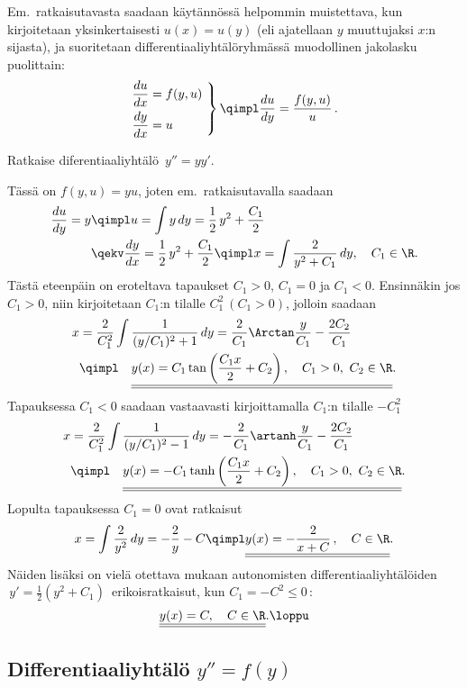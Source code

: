 Em.\ ratkaisutavasta saadaan käytännössä helpommin muistettava, kun kirjoitetaan
yksinkertaisesti $u(x)=u(y)$ (eli ajatellaan $y$ muuttujaksi $x$:n sijasta),
ja suoritetaan differentiaaliyhtälöryhmässä muodollinen jakolasku puolittain:
\[ \left. \begin{aligned}
\frac{du}{dx} &= f(y,u)\ \\ \frac{dy}{dx} &= u 
          \end{aligned} \right\} \qimpl \frac{du}{dy} =  \frac{f(y,u)}{u}\,.
\]
\begin{Exa} Ratkaise diferentiaaliyhtälö $\,y''=yy'$. \end{Exa}
\ratk Tässä on $f(y,u)=yu$, joten em.\ ratkaisutavalla saadaan
\begin{align*}
\frac{du}{dy}= y &\qimpl u=\int y\,dy=\frac{1}{2}\,y^2+\frac{C_1}{2} \\
                 &\qekv \frac{dy}{dx}=\frac{1}{2}\,y^2+\frac{C_1}{2}
                  \qimpl x= \int \frac{2}{y^2+C_1}\,dy, \quad C_1\in\R.
\end{align*}
Tästä eteenpäin on eroteltava tapaukset $C_1>0$, $C_1=0$ ja $C_1<0$. Ensinnäkin jos $C_1>0$,
niin kirjoitetaan $C_1$:n tilalle $C_1^2\ (C_1>0)$, jolloin saadaan
\begin{align*}
x &= \frac{2}{C_1^2}\int\frac{1}{(y/C_1)^2+1}\,dy
   = \frac{2}{C_1}\Arctan\frac{y}{C_1}-\frac{2C_2}{C_1} \\
  &\qimpl\quad \underline{\underline{y(x)
                  =C_1\tan\left(\frac{C_1 x}{2}+C_2\right), \quad C_1>0,\ C_2\in\R}}.
\end{align*}
Tapauksessa $C_1<0$ saadaan vastaavasti kirjoittamalla $C_1$:n tilalle $-C_1^2$
\begin{align*}
x &= \frac{2}{C_1^2}\int\frac{1}{(y/C_1)^2-1}\,dy
   = -\frac{2}{C_1}\artanh\frac{y}{C_1}-\frac{2C_2}{C_1} \\
  &\qimpl\quad \underline{\underline{y(x)
                  =-C_1\tanh\left(\frac{C_1 x}{2}+C_2\right), \quad C_1>0,\ C_2\in\R}}.
\end{align*}
Lopulta tapauksessa $C_1=0$ ovat ratkaisut
\[
x = \int \frac{2}{y^2}\,dy = -\frac{2}{y}-C \qimpl \underline{\underline{y(x)
                           = -\frac{2}{x+C}\,, \quad C\in\R}}.
\]
Näiden lisäksi on vielä otettava mukaan autonomisten differentiaaliyhtälöiden
$\,y'=\tfrac{1}{2}(y^2+C_1)\,$ erikoisratkaisut, kun $C_1=-C^2 \le 0\,$:
\[
\underline{\underline{y(x)=C, \quad C\in\R}}. \loppu
\]

\subsection{Differentiaaliyhtälö $y''=f(y)$}

